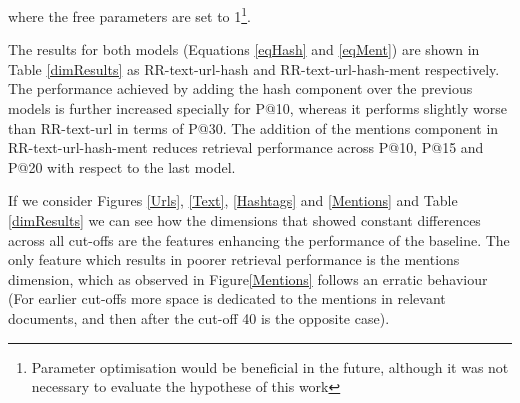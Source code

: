 \noindent where the free parameters are set to 1\footnote{Parameter optimisation would be beneficial in the future, although it was not necessary to evaluate the hypothese of this work}.

The results for both models (Equations \ref{eqHash} and \ref{eqMent}) are shown in Table \ref{dimResults} as RR-text-url-hash and RR-text-url-hash-ment respectively. The performance achieved by adding the hash component over the previous models is further increased specially for P@10, whereas it performs slightly worse than RR-text-url in terms of P@30. The addition of the mentions component in RR-text-url-hash-ment reduces retrieval performance across P@10, P@15 and P@20 with respect to the last model.











If we consider Figures \ref{Urls}, \ref{Text}, \ref{Hashtags} and \ref{Mentions} and Table \ref{dimResults} we can see how the dimensions that showed constant differences across all cut-offs are the features enhancing the performance of the baseline. The only feature which results in poorer retrieval performance is the mentions dimension, which as observed in Figure\ref{Mentions} follows an erratic behaviour (For earlier cut-offs more space is dedicated to the mentions in relevant documents, and then after the cut-off 40 is the opposite case).



